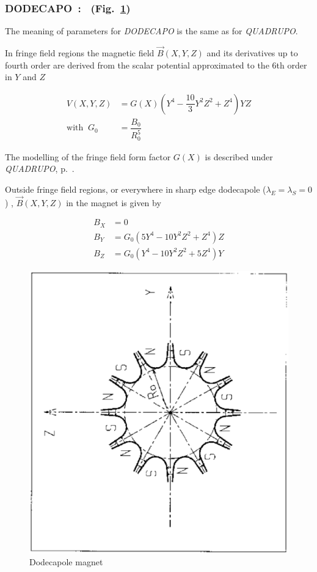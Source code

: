 \newpage

\subsubsection*{DODECAPO~: \DODECAPOTitl\  (Fig.\protect~\ref{fig19})} \label{DODECAPO}  
\medskip


 The meaning of parameters for \textsl{DODECAPO}  is the same as for \textsl{QUADRUPO}. 

\noindent In fringe field regions the magnetic field $ \vec  B(X,Y,Z) $ and
its derivatives up to fourth order are derived from the scalar potential approximated to 
the 6th order in $ Y $ and $ Z $ 

\begin{align*}
	V(X,Y,Z) &   = G(X) \left(Y^4- \dfrac{10 }{ 3} Y^2Z^2+Z^4 \right) YZ  \\
	\text{with } ~ G_0 &   =  \dfrac{ B_0 }{ R^5_0} 
\end{align*}

\noindent The  modelling of the fringe field form factor  $G(X)$
 is described under \textsl{QUADRUPO}, p.~\pageref{QUADRUPO}. 

\bigskip

\noindent Outside fringe field regions, or everywhere in sharp edge dodecapole
($ \lambda_ E=\lambda_ S=0$) , $ \vec  B(X,Y,Z) $ in the magnet is given by 

\begin{align*}
	B_X &   =   0 \\
	B_Y &   =    G_0(5Y^4-10Y^2Z^2+Z^4)Z \\
	B_Z &   = G_0(Y^4-10Y^2Z^2+5Z^4)Y  
\end{align*}
\vfill

\begin{figure}[H]
\centerline{\includegraphics[width=12cm,angle=-90]{Fig19.ps}}
\caption{\label{fig19}Dodecapole magnet}
\end{figure}
\vfill

